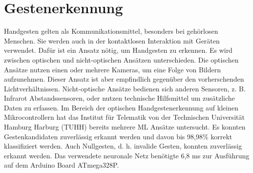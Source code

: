 \chapter{Gestenerkennung}
Handgesten gelten als Kommunikationsmittel, besonders bei gehörlosen Menschen. Sie werden auch in der kontaktlosen Interaktion mit Geräten verwendet. Dafür ist ein Ansatz nötig, um Handgesten
zu erkennen. Es wird zwischen optischen und nicht-optischen Ansätzen unterschieden. Die optischen Ansätze nutzen einen
oder mehrere Kameras, um eine Folge von Bildern aufzunehmen. Dieser Ansatz ist aber empfindlich gegenüber den vorherschenden Lichtverhältnissen.
Nicht-optische Ansätze bedienen sich anderen Sensoren, z. B. Infrarot Abstandssensoren, oder nutzen technische Hilfsmittel um zusätzliche Daten zu erfassen.
\newline
\newline
Im Bereich der optischen Handgestenerkennung auf kleinen Mikrocontrollern hat das Institut für Telematik von der Technischen Universität Hamburg Harburg (TUHH) bereits mehrere ML Ansätze untersucht.
Es konnten Gestenkandidaten zuverlässig erkannt werden und davon bis 98,98\% korrekt klassifiziert werden. Auch Nullgesten, d. h. invalide Gesten, konnten zuverlässig erkannt werden. Das verwendete neuronale Netz
benötigte 6,8 ms zur Ausführung auf dem Arduino Board ATmega328P.


